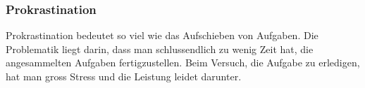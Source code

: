 \subsubsection{Prokrastination}
Prokrastination bedeutet so viel wie das Aufschieben von Aufgaben. Die Problematik liegt darin, dass man schlussendlich zu wenig Zeit hat, die angesammelten Aufgaben fertigzustellen. Beim Versuch, die Aufgabe zu erledigen, hat man gross Stress und die Leistung leidet darunter.
